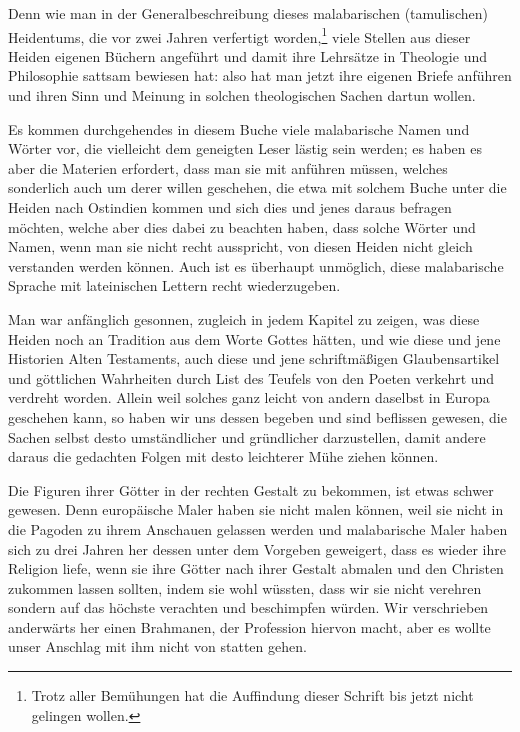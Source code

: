 \documentclass{article}
\begin{document}
Denn wie man in der Generalbeschreibung dieses malabarischen (tamulischen) Heidentums, die vor zwei Jahren verfertigt worden,\footnote{Trotz aller Bemühungen hat die Auffindung dieser Schrift bis jetzt nicht gelingen wollen.} viele Stellen aus dieser Heiden eigenen Büchern angeführt und damit ihre Lehrsätze in Theologie und Philosophie sattsam bewiesen hat: also hat man jetzt ihre eigenen Briefe anführen und ihren Sinn und Meinung in solchen theologischen Sachen dartun wollen.

Es kommen durchgehendes in diesem Buche viele malabarische Namen und Wörter vor, die vielleicht dem geneigten Leser lästig sein werden; es haben es aber die Materien erfordert, dass man sie mit anführen müssen, welches sonderlich auch um derer willen geschehen, die etwa mit solchem Buche unter die Heiden nach Ostindien kommen und sich dies und jenes daraus befragen möchten, welche aber dies dabei zu beachten haben, dass solche Wörter und Namen, wenn man sie nicht recht ausspricht, von diesen Heiden nicht gleich verstanden werden können. Auch ist es überhaupt unmöglich, diese malabarische Sprache mit lateinischen Lettern recht wiederzugeben.

Man war anfänglich gesonnen, zugleich in jedem Kapitel zu zeigen, was diese Heiden noch an Tradition aus dem Worte Gottes hätten, und wie diese und jene Historien Alten Testaments, auch diese und jene schriftmäßigen Glaubensartikel und göttlichen Wahrheiten durch List des Teufels von den Poeten verkehrt und verdreht worden. Allein weil solches ganz leicht von andern daselbst in Europa geschehen kann, so haben wir uns dessen begeben und sind beflissen gewesen, die Sachen selbst desto umständlicher und gründlicher darzustellen, damit andere daraus die gedachten Folgen mit desto leichterer Mühe ziehen können.

Die Figuren ihrer Götter in der rechten Gestalt zu bekommen, ist etwas schwer gewesen. Denn europäische Maler haben sie nicht malen können, weil sie nicht in die Pagoden zu ihrem Anschauen gelassen werden und malabarische Maler haben sich zu drei Jahren her dessen unter dem Vorgeben geweigert, dass es wieder ihre Religion liefe, wenn sie ihre Götter nach ihrer Gestalt abmalen und den Christen zukommen lassen sollten, indem sie wohl wüssten, dass wir sie nicht verehren sondern auf das höchste verachten und beschimpfen würden. Wir verschrieben anderwärts her einen Brahmanen, der Profession hiervon macht, aber es wollte unser Anschlag mit ihm nicht von statten gehen.
\end{document}
